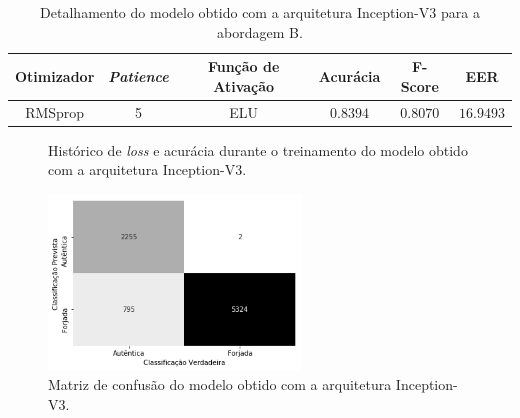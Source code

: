 \begin{table}[h!]
\centering
\caption{Detalhamento do modelo obtido com a arquitetura Inception-V3 para a abordagem B.}
\label{tab:shufflenet}
\begin{tabular}{cccccc}
\toprule
\textbf{Otimizador} & \textbf{\emph{Patience}}  & \textbf{Função de Ativação} & \textbf{Acurácia} & \textbf{F-Score} & \textbf{EER} \\
\midrule
RMSprop & 5 & ELU & $0.8394$ & $0.8070$ & $16.9493$ \\
\bottomrule
\end{tabular}
\end{table}

\begin{figure}[H]
\centering
\caption{Histórico de \emph{loss} e acurácia durante o treinamento do modelo obtido com a arquitetura Inception-V3.}
\label{fig:treinamento-inception}
\hfill
{}
\end{figure}

\begin{figure}[h]
    \centering
    \caption{Matriz de confusão do modelo obtido com a arquitetura Inception-V3.}\label{fig:matrizes-inception}
    \includegraphics[width=0.6\textwidth]{imgs/matriz-squeezenet-a}
\end{figure}